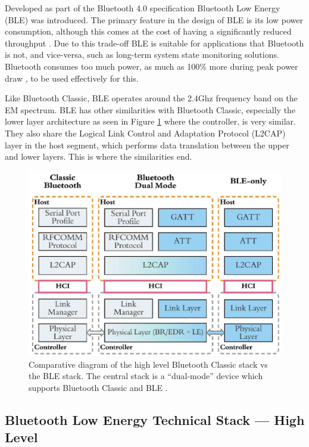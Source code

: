 \documentclass{l4proj}
\begin{document}
Developed as part of the Bluetooth 4.0 specification Bluetooth Low Energy (BLE) was introduced. The primary feature in the design of BLE is its low power consumption, although this comes at the cost of having a significantly reduced throughput \citep{gomez_overview_2012}. Due to this trade-off BLE is suitable for applications that Bluetooth is not, and vice-versa, such as long-term system state monitoring solutions. Bluetooth consumes too much power, as much as 100\% more during peak power draw \citep{iot_lab_classic_2020}, to be used effectively for this.

Like Bluetooth Classic, BLE operates around the 2.4Ghz frequency band on the EM spectrum. BLE has other similarities with Bluetooth Classic, especially the lower layer architecture as seen in Figure \ref{fig:bluetooth_stack_comparison} where the controller, is very similar. They also share the Logical Link Control and Adaptation Protocol (L2CAP) layer in the host segment, which performs data translation between the upper and lower layers. This is where the similarities end.

\begin{figure}[!htb]
    \centering
    \includegraphics[width=0.8\linewidth]{images/bluetooth_stacks.png}

    \caption{ Comparative diagram of the high level Bluetooth Classic stack vs the BLE stack. The central stack is a “dual-mode” device which supports Bluetooth Classic and BLE \citep{yang_beyond_2020}. }

    \label{fig:bluetooth_stack_comparison}
\end{figure}

\subsection{Bluetooth Low Energy Technical Stack — High Level}
\end{document}
